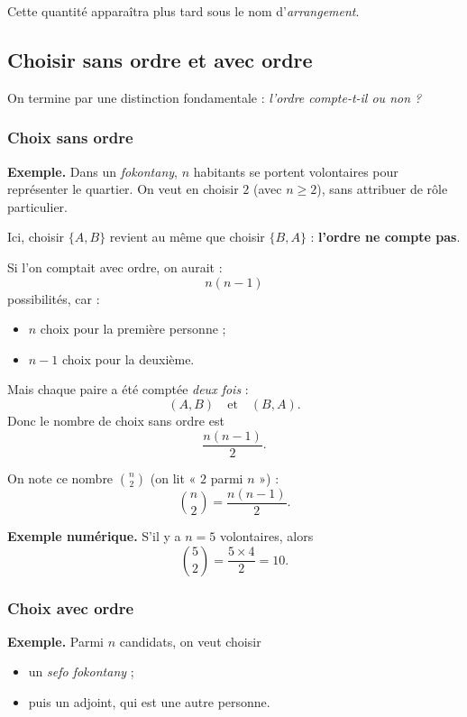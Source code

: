 Cette quantité apparaîtra plus tard sous le nom d’\emph{arrangement}.

\subsection{Choisir sans ordre et avec ordre}

On termine par une distinction fondamentale : 
\emph{l’ordre compte-t-il ou non ?}

\subsubsection{Choix sans ordre}

\noindent\textbf{Exemple.}
Dans un \emph{fokontany}, \(n\) habitants se portent volontaires pour représenter le quartier.
On veut en choisir \(2\) (avec \(n\ge 2\)), sans attribuer de rôle particulier.

Ici, choisir \(\{A,B\}\) revient au même que choisir \(\{B,A\}\) :
\textbf{l’ordre ne compte pas}.

\medskip

Si l’on comptait avec ordre, on aurait :
\[
n(n-1)
\]
possibilités, car :
\begin{itemize}
    \item \(n\) choix pour la première personne ;
    \item \(n-1\) choix pour la deuxième.
\end{itemize}

Mais chaque paire a été comptée \emph{deux fois} :
\[
(A,B)\quad \text{et}\quad (B,A).
\]
Donc le nombre de choix sans ordre est
\[
\frac{n(n-1)}{2}.
\]

On note ce nombre \(\binom{n}{2}\) (on lit « \(2\) parmi \(n\) ») :
\[
\binom{n}{2}=\frac{n(n-1)}{2}.
\]

\medskip

\noindent\textbf{Exemple numérique.}
S’il y a \(n=5\) volontaires, alors
\[
\binom{5}{2}=\frac{5\times 4}{2}=10.
\]

\subsubsection{Choix avec ordre}

\noindent\textbf{Exemple.}
Parmi \(n\) candidats, on veut choisir
\begin{itemize}
    \item un \emph{sefo fokontany} ;
    \item puis un adjoint, qui est une autre personne.
\end{itemize}

